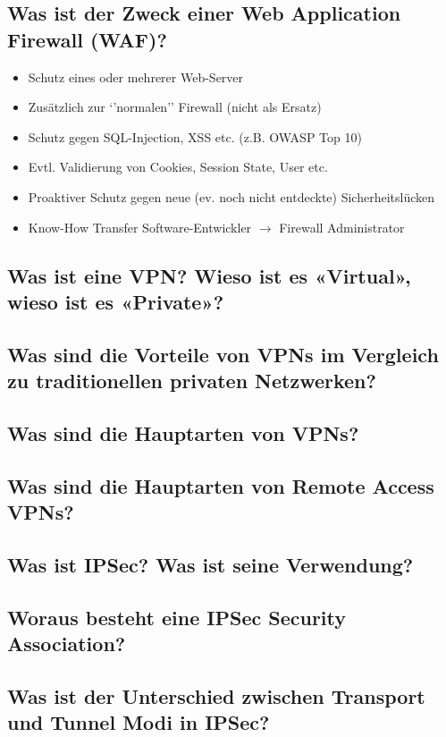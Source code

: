 \subsection*{Was ist der Zweck einer Web Application Firewall (WAF)?}
\begin{itemize}
    \item Schutz eines oder mehrerer Web-Server
    \item Zusätzlich zur `'normalen'' Firewall (nicht als Ersatz)
    \item Schutz gegen SQL-Injection, XSS etc. (z.B. OWASP Top 10)
    \item Evtl. Validierung von Cookies, Session State, User etc.
    \item Proaktiver Schutz gegen neue (ev. noch nicht entdeckte) Sicherheitslücken
    \item Know-How Transfer Software-Entwickler $\rightarrow$ Firewall Administrator
\end{itemize}

\subsection*{Was ist eine VPN? Wieso ist es «Virtual», wieso ist es «Private»?}
\subsection*{Was sind die Vorteile von VPNs im Vergleich zu traditionellen privaten Netzwerken?}
\subsection*{Was sind die Hauptarten von VPNs?}
\subsection*{Was sind die Hauptarten von Remote Access VPNs?}
\subsection*{Was ist IPSec? Was ist seine Verwendung?}
\subsection*{Woraus besteht eine IPSec Security Association?}
\subsection*{Was ist der Unterschied zwischen Transport und Tunnel Modi in IPSec?}